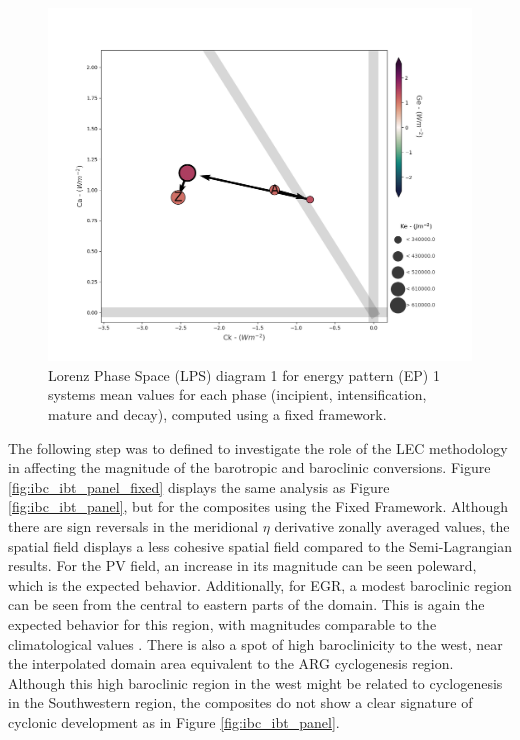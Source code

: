 \begin{figure}[!htbp]
\centering
\includegraphics[width=\textwidth]{figs_6/lps_fixed_means.png}
\caption[LPS for Fixed Framework Systems]{Lorenz Phase Space (LPS) diagram 1 for energy pattern (EP) 1 systems mean values for each phase (incipient, intensification, mature and decay), computed using a fixed framework.}
\label{fig:lps_fixed_means}
\end{figure}

The following step was to defined to investigate the role of the LEC methodology in affecting the magnitude of the barotropic and baroclinic conversions. Figure \ref{fig:ibc_ibt_panel_fixed} displays the same analysis as Figure \ref{fig:ibc_ibt_panel}, but for the composites using the Fixed Framework. Although there are sign reversals in the meridional $\eta$ derivative zonally averaged values, the spatial field displays a less cohesive spatial field compared to the Semi-Lagrangian results. For the PV field, an increase in its magnitude can be seen poleward, which is the expected behavior. Additionally, for EGR, a modest baroclinic region can be seen from the central to eastern parts of the domain. This is again the expected behavior for this region, with magnitudes comparable to the climatological values \citep{de2023storm}. There is also a spot of high baroclinicity to the west, near the interpolated domain area equivalent to the ARG cyclogenesis region. Although this high baroclinic region in the west might be related to cyclogenesis in the Southwestern region, the composites do not show a clear signature of cyclonic development as in Figure \ref{fig:ibc_ibt_panel}.

